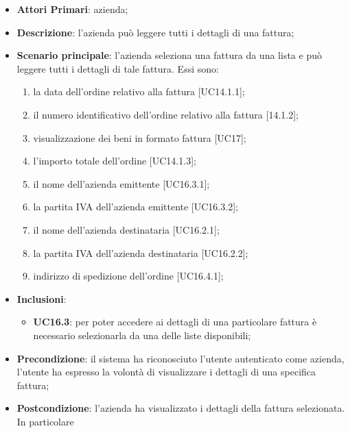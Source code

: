 \begin{itemize}
	\item \textbf{Attori Primari}: azienda;
	\item \textbf{Descrizione}: l'azienda può leggere tutti i dettagli di una fattura;
	\item \textbf{Scenario principale}: l'azienda seleziona una fattura da una lista e può leggere tutti i dettagli di tale fattura. Essi sono:
		\begin{enumerate}[label=\alph*.]
		\item la data dell'ordine relativo alla fattura [UC14.1.1];
		\item il numero identificativo dell'ordine relativo alla fattura [14.1.2];
		\item visualizzazione dei beni in formato fattura [UC17];
		\item l'importo totale dell'ordine [UC14.1.3];
		\item il nome dell'azienda emittente [UC16.3.1];
		\item la partita IVA dell'azienda emittente [UC16.3.2];
		\item il nome dell'azienda destinataria [UC16.2.1];
		\item la partita IVA dell'azienda destinataria [UC16.2.2];
		\item indirizzo di spedizione dell'ordine [UC16.4.1];
	\end{enumerate}
	\item \textbf{Inclusioni}:
	\begin{itemize}
		\item \textbf{UC16.3}: per poter accedere ai dettagli di una particolare fattura è necessario selezionarla da una delle liste disponibili;
	\end{itemize}
	\item \textbf{Precondizione}: il sistema ha riconosciuto l'utente autenticato come azienda, l'utente ha espresso la volontà di visualizzare i dettagli di una specifica fattura;
	\item \textbf{Postcondizione}: l'azienda ha visualizzato i dettagli della fattura selezionata. In particolare 
\end{itemize} 
